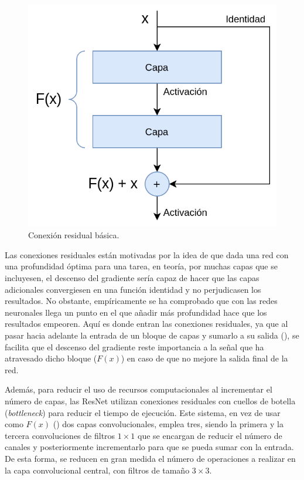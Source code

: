 \pagebreak

\begin{figure}
\vspace{-5pt}
\includegraphics[width=0.95\linewidth]{imagenes/residual-connection.png} 
\caption{Conexión residual básica.}
\label{fig:residual}
\end{figure}

Las conexiones residuales están motivadas por la idea de que dada una red con una profundidad óptima para una tarea, en teoría, por muchas capas que se incluyesen, el descenso del gradiente sería capaz de hacer que las capas adicionales convergiesen en una función identidad y no perjudicasen los resultados. No obstante, empíricamente se ha comprobado que con las redes neuronales llega un punto en el que añadir más profundidad hace que los resultados empeoren. Aquí es donde entran las conexiones residuales, ya que al pasar hacia adelante la entrada de un bloque de capas y sumarlo a su salida (), se facilita que el descenso del gradiente reste importancia a la señal que ha atravesado dicho bloque ($F(x)$) en caso de que no mejore la salida final de la red.

Además, para reducir el uso de recursos computacionales al incrementar el número de capas, las ResNet utilizan conexiones residuales con cuellos de botella (\textit{bottleneck}) para reducir el tiempo de ejecución. Este sistema, en vez de usar como $F(x)$ () dos capas convolucionales, emplea tres, siendo la primera y la tercera convoluciones de filtros $1\times1$ que se encargan de reducir el número de canales y posteriormente incrementarlo para que se pueda sumar con la entrada. De esta forma, se reducen en gran medida el número de operaciones a realizar en la capa convolucional central, con filtros de tamaño $3\times3$. 


